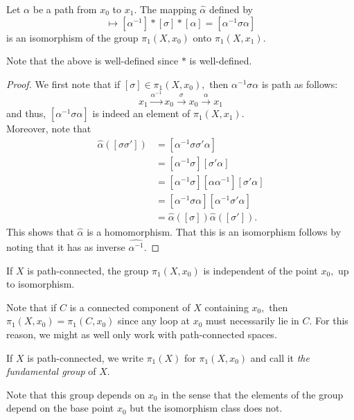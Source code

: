 \documentclass[12pt]{article}
\begin{document}
\begin{prop} \label{prop:alphainducesiso1}
	Let $\alpha$ be a path from $x_0$ to $x_1.$ The mapping $\widehat{\alpha}$ defined by
	\begin{equation*} 
		[\sigma] \mapsto [\alpha^{-1}]*[\sigma]*[\alpha] = [\alpha^{-1}\sigma\alpha]
	\end{equation*}
	is an isomorphism of the group $\pi_1(X, x_0)$ onto $\pi_1(X, x_1).$
\end{prop}
Note that the above is well-defined since $*$ is well-defined.
\begin{proof} 
	We first note that if $[\sigma] \in \pi_1(X, x_0),$ then $\alpha^{-1}\sigma\alpha$ is path as follows:
	\begin{equation*} 
		x_1 \overset{\alpha^{-1}}{\longrightarrow} x_0 \overset{\sigma}{\longrightarrow} x_0 \overset{\alpha}{\longrightarrow} x_1
	\end{equation*}
	and thus, $[\alpha^{-1}\sigma\alpha]$ is indeed an element of $\pi_1(X, x_1).$\\
	Moreover, note that
	\begin{align*} 
		\widehat{\alpha}([\sigma\sigma']) &= [\alpha^{-1}\sigma\sigma'\alpha]\\
		&= [\alpha^{-1}\sigma][\sigma'\alpha]\\
		&= [\alpha^{-1}\sigma][\alpha\alpha^{-1}][\sigma'\alpha]\\
		&= [\alpha^{-1}\sigma\alpha][\alpha^{-1}\sigma'\alpha]\\
		&= \widehat{\alpha}([\sigma])\widehat{\alpha}([\sigma']).
	\end{align*}
	This shows that $\widehat{\alpha}$ is a homomorphism. That this is an isomorphism follows by noting that it has as inverse $\widehat{\alpha^{-1}}.$
\end{proof}
\begin{cor}
	If $X$ is path-connected, the group $\pi_1(X, x_0)$ is independent of the point $x_0,$ up to isomorphism.
\end{cor}
Note that if $C$ is a connected component of $X$ containing $x_0,$ then $\pi_1(X, x_0) = \pi_1(C, x_0)$ since any loop at $x_0$ must necessarily lie in $C.$ For this reason, we might as well only work with path-connected spaces.
\begin{defn}
	If $X$ is path-connected, we write $\pi_1(X)$ for $\pi_1(X, x_0)$ and call it \emph{the fundamental group} of $X.$
\end{defn}
Note that this group depends on $x_0$ in the sense that the elements of the group depend on the base point $x_0$ but the isomorphism class does not.\\
\end{document}
